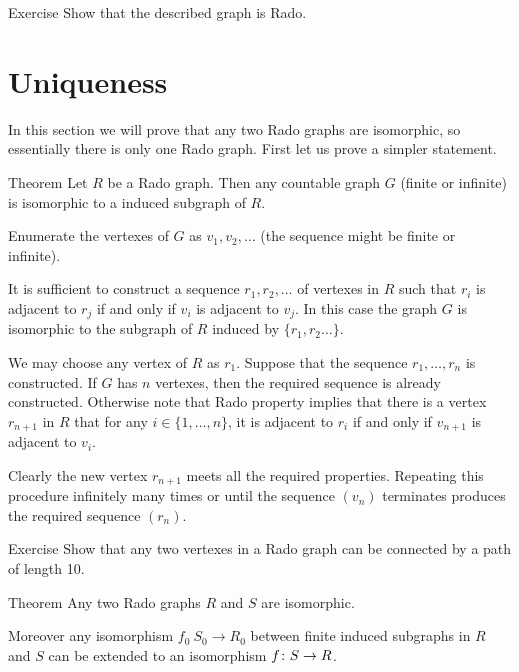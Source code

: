 \begin{thm}{Exercise}
Show that the described graph is Rado.
\end{thm}


\section*{Uniqueness}

In this section we will prove that any two Rado graphs are isomorphic, so essentially there is only one Rado graph.
First let us prove a simpler statement.

\begin{thm}{Theorem}\label{thm:rado-subgraph}
Let $R$ be a Rado graph.
Then any countable graph $G$ (finite or infinite) is isomorphic to a induced subgraph of $R$. 
\end{thm}

Enumerate the vertexes of $G$ as $v_1 , v_2 , \dots$ (the sequence might be finite or infinite).

It is sufficient to construct a sequence $r_1,r_2,\dots$ of vertexes in $R$ such that $r_i$ is adjacent to $r_j$ if and only if $v_i$ is adjacent to $v_j$.
In this case the graph $G$ is isomorphic to the subgraph of $R$ induced by $\{r_1,r_2\dots\}$.

We may choose any vertex of $R$ as $r_1$.
Suppose that the sequence $r_1,\dots,r_n$ is constructed.
If $G$ has $n$ vertexes, then the required sequence is already constructed.
Otherwise note that Rado property implies that there is a vertex $r_{n+1}$ in $R$ that for any $i\in\{1,\dots,n\}$, it is adjacent to $r_i$ if and only if $v_{n+1}$ is adjacent to $v_i$.

Clearly the new vertex $r_{n+1}$ meets all the required properties.
Repeating this procedure infinitely many times or until the sequence $(v_n)$ terminates produces the required sequence $(r_n)$.
\qeds


\begin{thm}{Exercise} Show that any two vertexes in a Rado graph can be connected by a path of length 10. \end{thm}


\begin{thm}{Theorem}
Any two Rado graphs $R$ and $S$ are isomorphic.

Moreover any isomorphism $f_0\:S_0\to R_0$ between finite induced subgraphs in $R$ and $S$ can be extended to an isomorphism $f\:S\z\to R$.
\end{thm}

